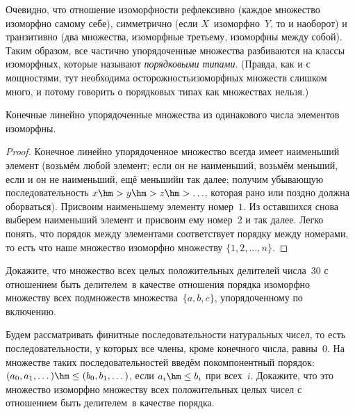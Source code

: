 Очевидно, что отношение изоморфности рефлексивно (каждое множество
изоморфно самому себе), симметрично (если $X$~изоморфно~$Y$, то
и наоборот) и транзитивно (два множества, изоморфные третьему,
изоморфны между собой). Таким образом, все частично
упорядоченные множества разбиваются на классы изоморфных,
которые называют \emph{порядковыми типами}.
(Правда, как и с
мощностями, тут необходима осторожность\т изоморфных множеств
слишком много, и потому говорить о порядковых типах как
множествах нельзя.)

\begin{theorem}\label{finite-linear-order}
Конечные линейно упорядоченные множества из одинакового
числа элементов изоморфны.
\end{theorem}

\begin{proof}
Конечное линейно упорядоченное множество всегда имеет наименьший
элемент (возьмём любой элемент; если он не наименьший, возьмём меньший,
если и он не наименьший, ещё меньший\т и так далее; получим
убывающую последовательность $x\hm>y\hm>z\hm>\ldots$, которая рано или
поздно должна оборваться). Присвоим наименьшему элементу номер~$1$.
Из оставшихся снова выберем наименьший
элемент и присвоим ему номер~$2$ и так далее. Легко понять,
что порядок между элементами соответствует порядку между
номерами, то есть что наше множество изоморфно множеству
$\{1,2,\dots,n\}$.
\end{proof}

\problskip

\begin{problem}
Докажите, что множество всех целых положительных делителей
числа~$30$ с отношением  быть делителем\ в качестве
отношения порядка изоморфно множеству всех подмножеств
множества~$\{a,b,c\}$, упорядоченному по включению.
\end{problem}

\begin{problem}
Будем рассматривать финитные последовательности%
 натуральных
чисел, то есть последовательности, у которых все члены, кроме
конечного числа, равны~$0$. На множестве таких
последовательностей введём покомпонентный порядок:
$(a_0,a_1,\dots) \hm\le (b_0,b_1,\dots)$, если $a_i\hm\le b_i$
при всех~$i$. Докажите, что это множество изоморфно множеству
всех положительных целых чисел с отношением  быть
делителем\ в качестве порядка.
\end{problem}

